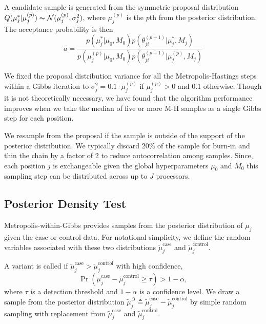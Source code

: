 \documentclass[11pt,reqno]{amsart}
\begin{document}
A candidate sample is generated from the symmetric proposal distribution $Q(\mu_j^* | \mu_j^{(p)}) \thicksim \mathcal{N}(\mu_j^{(p)}, \sigma_j^2)$, where $\mu_j^{(p)}$ is the $p$th from the posterior distribution. The acceptance probability is then
\begin{equation}
	a = \frac{ p(\mu_j^* | \mu_0, M_0) p(\theta^{(p+1)}_{ji} | \mu_j^*, M_j) } {p(\mu_j^{(p)} | \mu_0, M_0) p(\theta^{(p+1)}_{ji} | \mu_j^{(p)}, M_j)}
\end{equation}

We fixed the proposal distribution variance for all the Metropolis-Hastings steps within a Gibbs iteration to $\sigma_j^2 = 0.1 \cdot \mu_j^{(p)}$ if $\mu_j^{(p)} >0$ and $0.1$ otherwise. Though it is not theoretically necessary, we have found that the algorithm performance improves when we take the median of five or more M-H samples as a single Gibbs step for each position. 


We resample from the proposal if the sample is outside of the support of the posterior distribution. We typically discard 20\% of the sample for burn-in and thin the chain by a factor of 2 to reduce autocorrelation among samples. Since, each position $j$ is exchangeable given the global hyperparameters $\mu_0$ and $M_0$ this sampling step can be distributed across up to $J$ processors. 

\subsection{Posterior Density Test}\label{sec:hypothesis_test}
Metropolis-within-Gibbs provides samples from the posterior distribution of $\mu_j$ given the case or control data. For notational simplicity, we define the random variables associated with these two distributions $\tilde{\mu}_j^{\text{case}}$ and $\tilde{\mu}_j^{\text{control}}$.

A variant is called if $\tilde{\mu}_j^{\text{case}} > \tilde{\mu}_j^{\text{control}}$ with high confidence,
\begin{equation}\label{eqn:bayes_test}
	\Pr( \tilde{\mu}_j^{\text{case}} - \tilde{\mu}_j^{\text{control}} \geq \tau ) > 1-\alpha,
\end{equation}
where $\tau$ is a detection threshold and $1-\alpha$ is a confidence level. We draw a sample from the posterior distribution $\tilde{\mu}_j^{\Delta} \triangleq \tilde{\mu}_j^{\text{case}} - \tilde{\mu}_j^{\text{control}}$ by simple random sampling with replacement from $\tilde{\mu}_j^{\text{case}}$ and $\tilde{\mu}_j^{\text{control}}$.
\end{document}
